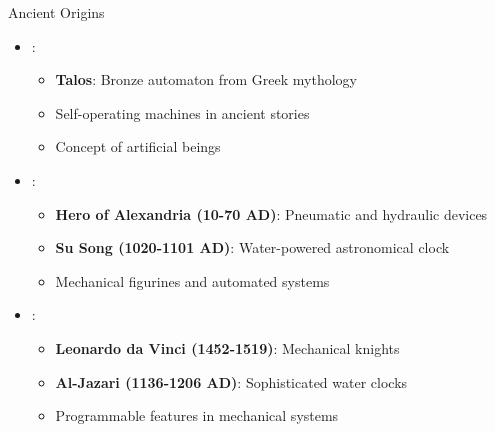 \begin{frame}{Ancient Origins}
\begin{itemize}
\item {}:
\begin{itemize}
\item \textbf{Talos}: Bronze automaton from Greek mythology
\item Self-operating machines in ancient stories
\item Concept of artificial beings
\end{itemize}
\vspace{0.5cm}
\item {}:
\begin{itemize}
\item \textbf{Hero of Alexandria (10-70 AD)}: Pneumatic and hydraulic devices
\item \textbf{Su Song (1020-1101 AD)}: Water-powered astronomical clock
\item Mechanical figurines and automated systems
\end{itemize}
\vspace{0.3cm}
\item {}:
\begin{itemize}
\item \textbf{Leonardo da Vinci (1452-1519)}: Mechanical knights
\item \textbf{Al-Jazari (1136-1206 AD)}: Sophisticated water clocks
\item Programmable features in mechanical systems
\end{itemize}
\end{itemize}
\end{frame}

